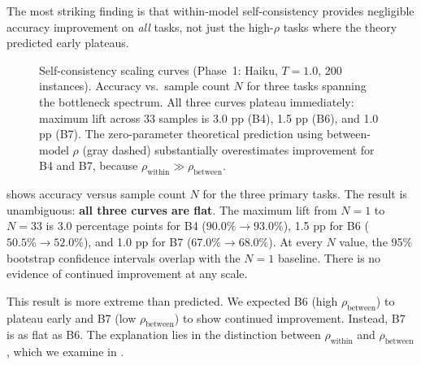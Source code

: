 \documentclass{article}
\theoremstyle{definition}
\theoremstyle{remark}
\begin{document}
The most striking finding is that within-model self-consistency provides negligible accuracy improvement on \emph{all} tasks, not just the high-$\rho$ tasks where the theory predicted early plateaus.

\begin{figure}[t]
    \centering
    \caption{Self-consistency scaling curves (Phase~1: Haiku, $T = 1.0$, 200 instances). Accuracy vs.\ sample count $N$ for three tasks spanning the bottleneck spectrum. All three curves plateau immediately: maximum lift across 33 samples is 3.0 pp (B4), 1.5 pp (B6), and 1.0 pp (B7). The zero-parameter theoretical prediction using between-model $\rho$ (gray dashed) substantially overestimates improvement for B4 and B7, because $\rho_{\text{within}} \gg \rho_{\text{between}}$.}
    \label{fig:scaling}
\end{figure}

 shows accuracy versus sample count $N$ for the three primary tasks.
The result is unambiguous: \textbf{all three curves are flat}.
The maximum lift from $N = 1$ to $N = 33$ is 3.0 percentage points for B4 ($90.0\% \to 93.0\%$), 1.5 pp for B6 ($50.5\% \to 52.0\%$), and 1.0 pp for B7 ($67.0\% \to 68.0\%$).
At every $N$ value, the 95\% bootstrap confidence intervals overlap with the $N = 1$ baseline.
There is no evidence of continued improvement at any scale.

This result is more extreme than predicted.
We expected B6 (high $\rho_{\text{between}}$) to plateau early and B7 (low $\rho_{\text{between}}$) to show continued improvement.
Instead, B7 is as flat as B6.
The explanation lies in the distinction between $\rho_{\text{within}}$ and $\rho_{\text{between}}$, which we examine in .
\end{document}
